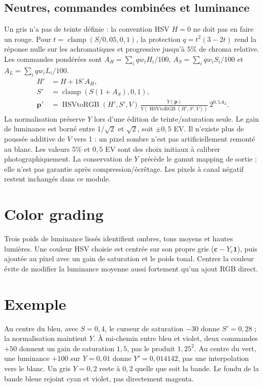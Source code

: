 \subsection{Neutres, commandes combinées et luminance}
Un gris n'a pas de teinte définie : la convention HSV $H=0$ ne doit pas en faire un rouge. Pour $t=\operatorname{clamp}(S/0{,}05,0,1)$, la protection $q=t^2(3-2t)$ rend la réponse nulle sur les achromatiques et progressive jusqu'à 5\% de chroma relative. Les commandes pondérées sont $A_H=\sum_i qw_iH_i/100$, $A_S=\sum_i qw_iS_i/100$ et $A_L=\sum_i qw_iL_i/100$.
\begin{align}
 H'&=H+18^\circ A_H,\\
 S'&=\operatorname{clamp}(S(1+A_S),0,1),\\
 \mathbf{p}'&=\operatorname{HSVtoRGB}(H',S',V)\,
 \frac{Y(\mathbf{p})}{Y(\operatorname{HSVtoRGB}(H',S',V))}\,2^{0{,}5A_L}.
\end{align}
La normalisation préserve $Y$ lors d'une édition de teinte/saturation seule. Le gain de luminance est borné entre $1/\sqrt{2}$ et $\sqrt{2}$, soit $\pm0{,}5$ EV. Il n'existe plus de poussée additive de $V$ vers 1 : un pixel sombre n'est pas artificiellement remonté au blanc. Les valeurs 5\% et $0{,}5$ EV sont des choix initiaux à calibrer photographiquement. La conservation de $Y$ précède le gamut mapping de sortie ; elle n'est pas garantie après compression/écrêtage. Les pixels à canal négatif restent inchangés dans ce module.

\section{Color grading}
Trois poids de luminance lissés identifient ombres, tons moyens et hautes lumières. Une couleur HSV choisie est centrée sur son propre gris ($\mathbf{c}-Y_c\mathbf{1}$), puis ajoutée au pixel avec un gain de saturation et le poids tonal. Centrer la couleur évite de modifier la luminance moyenne aussi fortement qu'un ajout RGB direct.

\section{Exemple}
Au centre du bleu, avec $S=0{,}4$, le curseur de saturation $-30$ donne $S'=0{,}28$ ; la normalisation maintient $Y$. À mi-chemin entre bleu et violet, deux commandes $+50$ donnent un gain de saturation $1{,}5$, pas le produit $1{,}25^2$. Au centre du vert, une luminance $+100$ sur $Y=0{,}01$ donne $Y'=0{,}014142$, pas une interpolation vers le blanc. Un gris $Y=0{,}2$ reste à $0{,}2$ quelle que soit la bande. Le fondu de la bande bleue rejoint cyan et violet, pas directement magenta.

